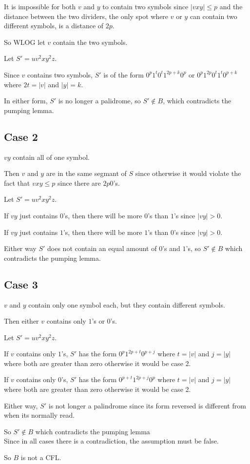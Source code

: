 \documentclass[letterpaper, 11pt]{article}
\begin{document}
It is impossible for both $v$ and $y$ to contain two symbols since $|vxy| \leq p$ and the distance between the two dividers, the only spot where $v$ or $y$ can contain two different symbols, is a distance of $2p$.

So WLOG let $v$ contain the two symbols.

Let $S' = uv^2xy^2z$.

Since $v$ contains two symbols, $S'$ is of the form $0^p1^t0^t1^{2p+k}0^p$ or $0^p1^{2p}0^t1^t0^{p+k}$ where $2t = |v|$ and $|y| = k$.

In either form, $S'$ is no longer a palidrome, so $S' \notin B$, which contradicts the pumping lemma.
\subsection*{Case 2}
$vy$ contain all of one symbol.

Then $v$ and $y$ are in the same segmant of $S$ since otherwise it would violate the fact that $vxy \leq p$ since there are $2p 0$'s.

Let $S' = uv^2xy^2z$.

If $vy$ just contains $0$'s, then there will be more $0$'s than $1$'s since $|vy| > 0$.

If $vy$ just contains $1$'s, then there will be more $1$'s than $0$'s since $|vy| > 0$.

Either way $S'$ does not contain an equal amount of $0$'s and $1$'s, so $S' \notin B$ which contradicts the pumping lemma.

\subsection*{Case 3}
$v$ and $y$ contain only one symbol each, but they contain different symbols.

Then either $v$ contains only $1$'s or $0$'s.

Let $S' = uv^2xy^2z$.

If $v$ contains only $1$'s, $S'$ has the form $0^p1^{2p+t}0^{p+j}$ where $t = |v|$ and $j = |y|$ where both are greater than zero otherwise it would be case 2.

If $v$ contains only $0$'s, $S'$ has the form $0^{p+t}1^{2p+j}0^p$ where $t = |v|$ and $j = |y|$ where both are greater than zero otherwise it would be case 2.

Either way, $S'$ is not longer a palindrome since its form reversed is different from when its normally read.

So $S' \notin B$ which contradicts the pumping lemma\\

Since in all cases there is a contradiction, the assumption must be false.

So $B$ is not a CFL.
\newpage
\end{document}
